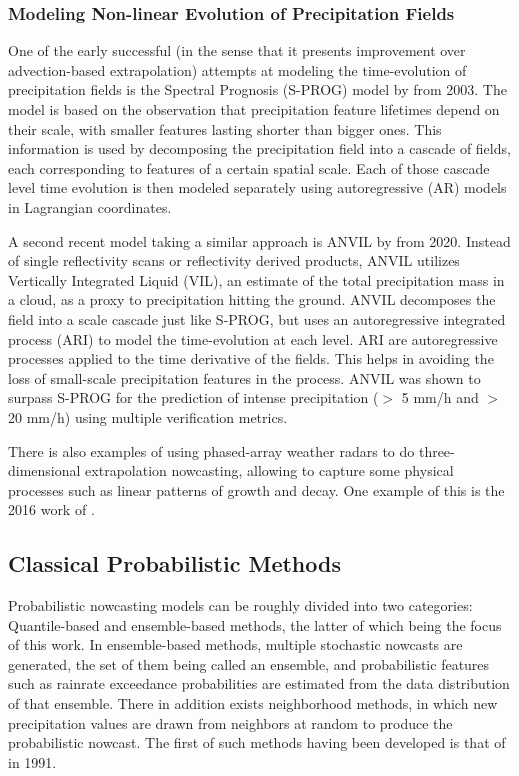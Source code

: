 \subsubsection*{Modeling Non-linear Evolution of Precipitation Fields}

One of the early successful (in the sense that it presents improvement over advection-based extrapolation) attempts at modeling the time-evolution of precipitation fields is the Spectral Prognosis (S-PROG) model by \citet{seed_dynamic_2003} from 2003. The model is based on the observation that precipitation feature lifetimes depend on their scale, with smaller features lasting shorter than bigger ones. This information is used by decomposing the precipitation field into a cascade of fields, each corresponding to features of a certain spatial scale. Each of those cascade level time evolution is then modeled separately using autoregressive (AR) models in Lagrangian coordinates. %

A second recent model taking a similar approach is ANVIL by \citet{pulkkinen_nowcasting_2020} from 2020. Instead of single reflectivity scans or reflectivity derived products, ANVIL utilizes Vertically Integrated Liquid (VIL), an estimate of the total precipitation mass in a cloud, as a proxy to precipitation hitting the ground. ANVIL decomposes the field into a scale cascade just like S-PROG, but uses an autoregressive integrated process (ARI) to model the time-evolution at each level. ARI are autoregressive processes applied to the time derivative of the fields. This helps in avoiding the loss of small-scale precipitation features in the process. ANVIL was shown to surpass S-PROG for the prediction of intense precipitation ($>$ 5 mm/h and $>$ 20 mm/h) using multiple verification metrics. 

There is also examples of using phased-array weather radars to do three-dimensional extrapolation nowcasting, allowing to capture some physical processes such as linear patterns of growth and decay. One example of this is the 2016 work of \citet{otsuka_precipitation_2016}. 


\subsection{Classical Probabilistic Methods}

Probabilistic nowcasting models can be roughly divided into two categories: Quantile-based and ensemble-based methods, the latter of which being the focus of this work. In ensemble-based methods, multiple stochastic nowcasts are generated, the set of them being called an ensemble, and probabilistic features such as rainrate exceedance probabilities are estimated from the data distribution of that ensemble.  
There in addition exists neighborhood methods, in which new precipitation values are drawn from neighbors at random to produce the probabilistic nowcast. The first of such methods having been developed is that of \citet{andersson_model_1991} in 1991. 


